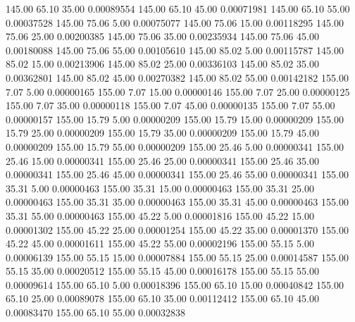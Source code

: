     145.00     65.10     35.00     0.00089554
    145.00     65.10     45.00     0.00071981
    145.00     65.10     55.00     0.00037528
    145.00     75.06      5.00     0.00075077
    145.00     75.06     15.00     0.00118295
    145.00     75.06     25.00     0.00200385
    145.00     75.06     35.00     0.00235934
    145.00     75.06     45.00     0.00180088
    145.00     75.06     55.00     0.00105610
    145.00     85.02      5.00     0.00115787
    145.00     85.02     15.00     0.00213906
    145.00     85.02     25.00     0.00336103
    145.00     85.02     35.00     0.00362801
    145.00     85.02     45.00     0.00270382
    145.00     85.02     55.00     0.00142182
    155.00      7.07      5.00     0.00000165
    155.00      7.07     15.00     0.00000146
    155.00      7.07     25.00     0.00000125
    155.00      7.07     35.00     0.00000118
    155.00      7.07     45.00     0.00000135
    155.00      7.07     55.00     0.00000157
    155.00     15.79      5.00     0.00000209
    155.00     15.79     15.00     0.00000209
    155.00     15.79     25.00     0.00000209
    155.00     15.79     35.00     0.00000209
    155.00     15.79     45.00     0.00000209
    155.00     15.79     55.00     0.00000209
    155.00     25.46      5.00     0.00000341
    155.00     25.46     15.00     0.00000341
    155.00     25.46     25.00     0.00000341
    155.00     25.46     35.00     0.00000341
    155.00     25.46     45.00     0.00000341
    155.00     25.46     55.00     0.00000341
    155.00     35.31      5.00     0.00000463
    155.00     35.31     15.00     0.00000463
    155.00     35.31     25.00     0.00000463
    155.00     35.31     35.00     0.00000463
    155.00     35.31     45.00     0.00000463
    155.00     35.31     55.00     0.00000463
    155.00     45.22      5.00     0.00001816
    155.00     45.22     15.00     0.00001302
    155.00     45.22     25.00     0.00001254
    155.00     45.22     35.00     0.00001370
    155.00     45.22     45.00     0.00001611
    155.00     45.22     55.00     0.00002196
    155.00     55.15      5.00     0.00006139
    155.00     55.15     15.00     0.00007884
    155.00     55.15     25.00     0.00014587
    155.00     55.15     35.00     0.00020512
    155.00     55.15     45.00     0.00016178
    155.00     55.15     55.00     0.00009614
    155.00     65.10      5.00     0.00018396
    155.00     65.10     15.00     0.00040842
    155.00     65.10     25.00     0.00089078
    155.00     65.10     35.00     0.00112412
    155.00     65.10     45.00     0.00083470
    155.00     65.10     55.00     0.00032838
